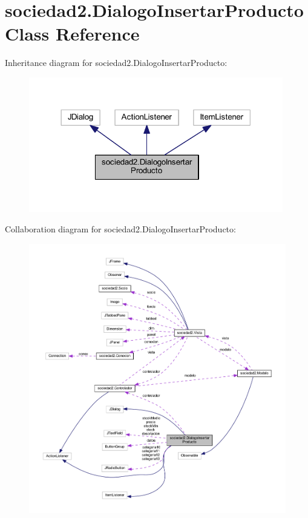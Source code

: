 \hypertarget{classsociedad2_1_1_dialogo_insertar_producto}{}\section{sociedad2.\+Dialogo\+Insertar\+Producto Class Reference}
\label{classsociedad2_1_1_dialogo_insertar_producto}


Inheritance diagram for sociedad2.\+Dialogo\+Insertar\+Producto\+:\nopagebreak
\begin{figure}[H]
\begin{center}
\leavevmode
\includegraphics[width=314pt]{classsociedad2_1_1_dialogo_insertar_producto__inherit__graph}
\end{center}
\end{figure}


Collaboration diagram for sociedad2.\+Dialogo\+Insertar\+Producto\+:
\nopagebreak
\begin{figure}[H]
\begin{center}
\leavevmode
\includegraphics[width=350pt]{classsociedad2_1_1_dialogo_insertar_producto__coll__graph}
\end{center}
\end{figure}
